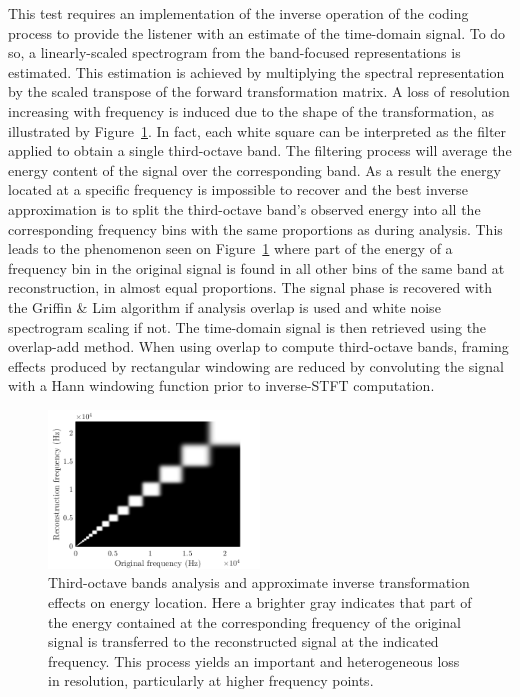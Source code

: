 \documentclass[sensors,article,submit,moreauthors,pdftex,10pt,a4paper]{mdpi}
\begin{document}
This test requires an implementation of the inverse operation of the coding process to provide the listener with an estimate of the time-domain signal. To do so, a linearly-scaled spectrogram from the band-focused representations is estimated. This estimation is achieved by multiplying the spectral representation by the scaled transpose of the forward transformation matrix. A loss of resolution increasing with frequency is induced due to the shape of the transformation, as illustrated by Figure~\ref{fig:freq}. In fact, each white square can be interpreted as the filter applied to obtain a single third-octave band. The filtering process will average the energy content of the signal over the corresponding band. As a result the energy located at a specific frequency is impossible to recover and the best inverse approximation is to split the third-octave band's observed energy into all the corresponding frequency bins with the same proportions as during analysis. This leads to the phenomenon seen on Figure~\ref{fig:freq} where part of the energy of a frequency bin in the original signal is found in all other bins of the same band at reconstruction, in almost equal proportions. The signal phase is recovered with the Griffin \& Lim algorithm \cite{griffin1984} if analysis overlap is used and white noise spectrogram scaling if not. The time-domain signal is then retrieved using the overlap-add method. When using overlap to compute third-octave bands, framing effects produced by rectangular windowing are reduced by convoluting the signal with a Hann windowing function prior to inverse-STFT computation.


\begin{figure}[htbp]
	\centering
		\includegraphics[width=0.5\textwidth]{figures/freq.png}
	\caption{Third-octave bands analysis and approximate inverse transformation effects on energy location. Here a brighter gray indicates that part of the energy contained at the corresponding frequency of the original signal is transferred to the reconstructed signal at the indicated frequency. This process yields an important and heterogeneous loss in resolution, particularly at higher frequency points.}
	\label{fig:freq}
\end{figure}
\end{document}
